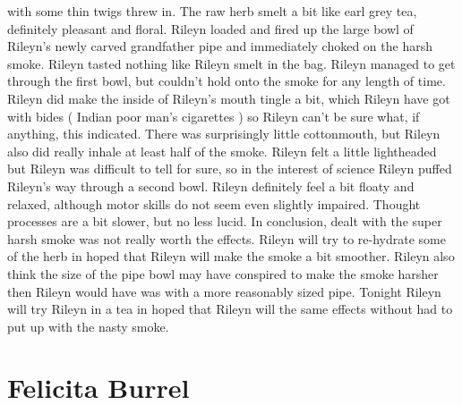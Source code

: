 \documentclass[12pt]{book}
\begin{document}
with some thin twigs threw in. The raw herb smelt a bit like earl grey tea, definitely pleasant and floral. Rileyn loaded and fired up the large bowl of Rileyn's newly carved grandfather pipe and immediately choked on the harsh smoke. Rileyn tasted nothing like Rileyn smelt in the bag. Rileyn managed to get through the first bowl, but couldn't hold onto the smoke for any length of time. Rileyn did make the inside of Rileyn's mouth tingle a bit, which Rileyn have got with bides ( Indian poor man's cigarettes ) so Rileyn can't be sure what, if anything, this indicated. There was surprisingly little cottonmouth, but Rileyn also did really inhale at least half of the smoke. Rileyn felt a little lightheaded but Rileyn was difficult to tell for sure, so in the interest of science Rileyn puffed Rileyn's way through a second bowl. Rileyn definitely feel a bit floaty and relaxed, although motor skills do not seem even slightly impaired. Thought processes are a bit slower, but no less lucid. In conclusion, dealt with the super harsh smoke was not really worth the effects. Rileyn will try to re-hydrate some of the herb in hoped that Rileyn will make the smoke a bit smoother. Rileyn also think the size of the pipe bowl may have conspired to make the smoke harsher then Rileyn would have was with a more reasonably sized pipe. Tonight Rileyn will try Rileyn in a tea in hoped that Rileyn will the same effects without had to put up with the nasty smoke.



\chapter{Felicita Burrel}
\end{document}
